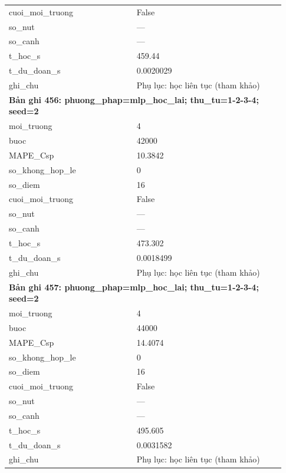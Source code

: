 \begin{longtable}{p{0.43\linewidth}p{0.50\linewidth}}
cuoi\_\allowbreak moi\_\allowbreak truong & False \\
so\_\allowbreak nut & — \\
so\_\allowbreak canh & — \\
t\_\allowbreak hoc\_\allowbreak s & 459.44 \\
t\_\allowbreak du\_\allowbreak doan\_\allowbreak s & 0.0020029 \\
ghi\_\allowbreak chu & Phụ lục: học liên tục (tham khảo) \\
\midrule
\multicolumn{2}{p{0.95\linewidth}}{\textbf{Bản ghi 456: phuong\_phap=mlp\_hoc\_lai; thu\_tu=1-2-3-4; seed=2}} \\
moi\_\allowbreak truong & 4 \\
buoc & 42000 \\
MAPE\_\allowbreak Csp & 10.3842 \\
so\_\allowbreak khong\_\allowbreak hop\_\allowbreak le & 0 \\
so\_\allowbreak diem & 16 \\
cuoi\_\allowbreak moi\_\allowbreak truong & False \\
so\_\allowbreak nut & — \\
so\_\allowbreak canh & — \\
t\_\allowbreak hoc\_\allowbreak s & 473.302 \\
t\_\allowbreak du\_\allowbreak doan\_\allowbreak s & 0.0018499 \\
ghi\_\allowbreak chu & Phụ lục: học liên tục (tham khảo) \\
\midrule
\multicolumn{2}{p{0.95\linewidth}}{\textbf{Bản ghi 457: phuong\_phap=mlp\_hoc\_lai; thu\_tu=1-2-3-4; seed=2}} \\
moi\_\allowbreak truong & 4 \\
buoc & 44000 \\
MAPE\_\allowbreak Csp & 14.4074 \\
so\_\allowbreak khong\_\allowbreak hop\_\allowbreak le & 0 \\
so\_\allowbreak diem & 16 \\
cuoi\_\allowbreak moi\_\allowbreak truong & False \\
so\_\allowbreak nut & — \\
so\_\allowbreak canh & — \\
t\_\allowbreak hoc\_\allowbreak s & 495.605 \\
t\_\allowbreak du\_\allowbreak doan\_\allowbreak s & 0.0031582 \\
ghi\_\allowbreak chu & Phụ lục: học liên tục (tham khảo) \\

\end{longtable}
